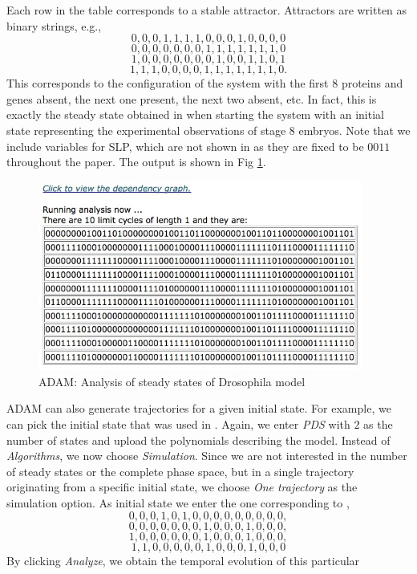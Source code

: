 \documentclass[11pt]{amsart}
\begin{document}
Each row in the table corresponds to a stable attractor. Attractors are written as binary strings, e.g.,
$$0, 0, 0, 1, 1, 1, 1, 0, 0, 0, 1, 0, 0, 0, 0$$
$$0, 0, 0, 0, 0, 0, 0, 1, 1, 1, 1, 1, 1, 1, 0$$
$$1, 0, 0, 0, 0, 0, 0, 0, 1, 0, 0, 1, 1, 0, 1$$
$$1, 1, 1, 0, 0, 0, 0, 1, 1, 1, 1, 1, 1, 1, 0.$$
This corresponds to the configuration of the system with the first 8 proteins and genes absent, the next one present, the next two absent, etc. In fact, this is exactly the steady state obtained in \cite[Figure 4(b)]{AO} when starting the system with an initial state representing the experimental observations of stage 8 embryos. Note that we include variables for SLP, which are not shown in \cite[Figure 4(b)]{AO} as they are fixed to be $0011$ throughout the paper. The output is shown in Fig \ref{fig:alg}.
\begin{figure}[htb]
\centering
\includegraphics[width=0.95\textwidth]{DroAlgOutput.jpg}
\caption{ADAM: Analysis of steady states of Drosophila model}
\label{fig:alg}
\end{figure}
ADAM can also generate trajectories for a given initial state. For example, we
can pick the initial state that was used in \cite[Figure 4(a)]{AO}. Again, we
enter {\it PDS} with $2$ as the number of states and upload the polynomials
describing the model. Instead of {\it Algorithms}, we now choose {\it
Simulation}. Since we are not interested in the number of steady states or the
complete phase space, but in a single trajectory originating from a specific
initial state,  we choose {\it One trajectory} as the simulation option. As
initial state we enter the one corresponding to \cite[Figure 4(a)]{AO},
$$0, 0, 0, 1, 0, 1, 0, 0, 0, 0, 0, 0, 0, 0, 0,$$
$$0, 0, 0, 0, 0, 0, 0, 1, 0, 0, 0, 1, 0, 0, 0,$$
$$1, 0, 0, 0, 0, 0, 0, 1, 0, 0, 0, 1, 0, 0, 0,$$
$$1, 1, 0, 0, 0, 0, 0, 1, 0, 0, 0, 1, 0, 0, 0$$
By clicking {\it Analyze}, we obtain the temporal evolution of this particular
\end{document}
